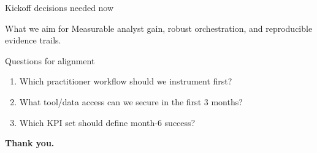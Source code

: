 \documentclass[10pt,aspectratio=169]{beamer}
\begin{document}
\begin{frame}{Kickoff decisions needed now}
    \begin{block}{What we aim for}
        Measurable analyst gain, robust orchestration, and reproducible evidence trails.
    \end{block}

    \begin{block}{Questions for alignment}
        \begin{enumerate}
            \item Which practitioner workflow should we instrument first?
            \item What tool/data access can we secure in the first 3 months?
            \item Which KPI set should define month-6 success?
        \end{enumerate}
    \end{block}
    \centering
    \textbf{Thank you.}
\end{frame}
\end{document}
